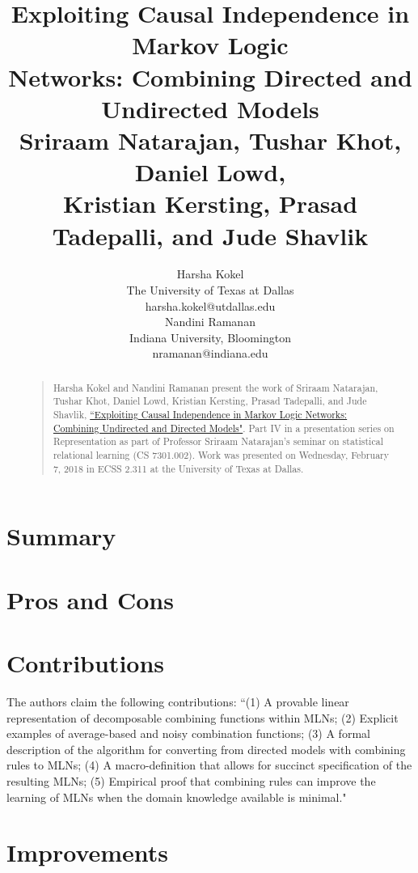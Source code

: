 \documentclass[letterpaper]{article}
\begin{document}
%
\title{Exploiting Causal Independence in Markov Logic\\Networks: Combining Directed and Undirected Models\\
\large Sriraam Natarajan, Tushar Khot, Daniel Lowd,\\Kristian Kersting, Prasad Tadepalli, and Jude Shavlik
}
\author{Harsha Kokel\\
The University of Texas at Dallas\\
harsha.kokel@utdallas.edu\\
\And
Nandini Ramanan\\
Indiana University, Bloomington\\
nramanan@indiana.edu\\
}

\maketitle
\begin{abstract}
\begin{quote}
Harsha Kokel and Nandini Ramanan present the work of Sriraam Natarajan, Tushar Khot, Daniel Lowd, Kristian Kersting, Prasad Tadepalli, and Jude Shavlik, \href{http://homes.soic.indiana.edu/natarasr/Papers/Natarajan.ECML10.pdf}{``Exploiting Causal Independence in Markov Logic Networks: Combining Undirected and Directed Models"}. Part IV in a presentation series on Representation as part of Professor Sriraam Natarajan's seminar on statistical relational learning (CS 7301.002). Work was presented on Wednesday, February 7, 2018 in ECSS 2.311 at the University of Texas at Dallas.
\end{quote}
\end{abstract}

\section{Summary}

\section{Pros and Cons}

\section{Contributions}

The authors claim the following contributions: ``(1) A provable linear representation of decomposable combining functions within MLNs; (2) Explicit examples of average-based and noisy combination functions; (3) A formal description of the algorithm for converting from directed models with combining rules to MLNs; (4) A macro-definition that allows for succinct specification of the resulting MLNs; (5) Empirical proof that combining rules can improve the learning of MLNs when the domain knowledge available is minimal."

\section{Improvements}
\end{document}
